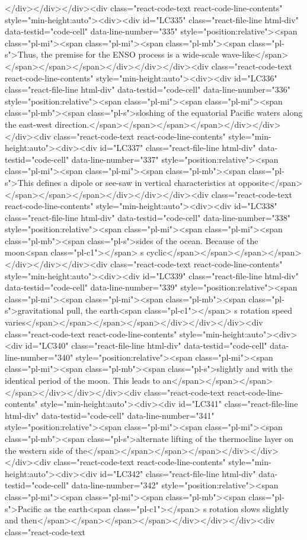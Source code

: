 {{{{</div></div></div><div class="react-code-text react-code-line-contents" style="min-height:auto"><div><div id="LC335" class="react-file-line html-div" data-testid="code-cell" data-line-number="335" style="position:relative"><span class="pl-mi"><span class="pl-mi"><span class="pl-mb"><span class="pl-s">Thus, the premise for the ENSO process is a wide-scale wave-like</span></span></span></span></div></div></div><div class="react-code-text react-code-line-contents" style="min-height:auto"><div><div id="LC336" class="react-file-line html-div" data-testid="code-cell" data-line-number="336" style="position:relative"><span class="pl-mi"><span class="pl-mi"><span class="pl-mb"><span class="pl-s">sloshing of the equatorial Pacific waters along the east-west direction.</span></span></span></span></div></div></div><div class="react-code-text react-code-line-contents" style="min-height:auto"><div><div id="LC337" class="react-file-line html-div" data-testid="code-cell" data-line-number="337" style="position:relative"><span class="pl-mi"><span class="pl-mi"><span class="pl-mb"><span class="pl-s">This defines a dipole or see-saw in vertical characteristics at opposite</span></span></span></span></div></div></div><div class="react-code-text react-code-line-contents" style="min-height:auto"><div><div id="LC338" class="react-file-line html-div" data-testid="code-cell" data-line-number="338" style="position:relative"><span class="pl-mi"><span class="pl-mi"><span class="pl-mb"><span class="pl-s">sides of the ocean. Because of the moon<span class="pl-c1">\textquotesingle</span> s cyclic</span></span></span></span></div></div></div><div class="react-code-text react-code-line-contents" style="min-height:auto"><div><div id="LC339" class="react-file-line html-div" data-testid="code-cell" data-line-number="339" style="position:relative"><span class="pl-mi"><span class="pl-mi"><span class="pl-mb"><span class="pl-s">gravitational pull, the earth<span class="pl-c1">\textquotesingle</span> s rotation speed varies</span></span></span></span></div></div></div><div class="react-code-text react-code-line-contents" style="min-height:auto"><div><div id="LC340" class="react-file-line html-div" data-testid="code-cell" data-line-number="340" style="position:relative"><span class="pl-mi"><span class="pl-mi"><span class="pl-mb"><span class="pl-s">slightly and with the identical period of the moon. This leads to an</span></span></span></span></div></div></div><div class="react-code-text react-code-line-contents" style="min-height:auto"><div><div id="LC341" class="react-file-line html-div" data-testid="code-cell" data-line-number="341" style="position:relative"><span class="pl-mi"><span class="pl-mi"><span class="pl-mb"><span class="pl-s">alternate lifting of the thermocline layer on the western side of the</span></span></span></span></div></div></div><div class="react-code-text react-code-line-contents" style="min-height:auto"><div><div id="LC342" class="react-file-line html-div" data-testid="code-cell" data-line-number="342" style="position:relative"><span class="pl-mi"><span class="pl-mi"><span class="pl-mb"><span class="pl-s">Pacific as the earth<span class="pl-c1">\textquotesingle</span> s rotation slows slightly and then</span></span></span></span></div></div></div><div class="react-code-text }}}}
